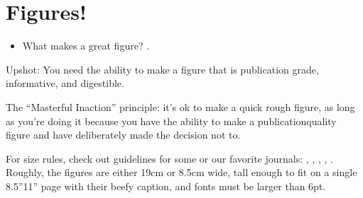 \documentclass[letterpaper,10pt,english]{sphinxmanual}
\begin{document}
\section{Figures!}
\label{\detokenize{02Elements:figures}}\begin{itemize}
\item {} 
\sphinxAtStartPar
What makes a great figure? .

\end{itemize}

\sphinxAtStartPar
Upshot: You need the ability to make a figure that is publication grade, informative, and digestible. 

\sphinxAtStartPar
The “Masterful Inaction” principle: it’s ok to make a quick rough figure, as long as you’re doing it because you have the ability to make a publication\sphinxhyphen{}quality figure and have deliberately made the decision not to.

\sphinxAtStartPar
For size rules, check out guidelines for some or our favorite journals:
,
,
,
,
.
Roughly, the figures are either 19cm or 8.5cm wide, tall enough to fit on a single 8.5”\sphinxhyphen{}11” page with their beefy caption, and fonts must be larger than 6pt.
\end{document}
